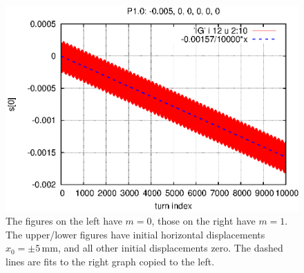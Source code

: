 \documentclass[]{article}
\begin{document}
\begin{figure}[h]
\includegraphics[scale=0.6]{eps/SpinEvolve12.P1.0.eps}
\caption{\label{fig:SpinEvolve11.12}The figures on the left have 
$m=0$, those on the right have $m=1$. The upper/lower figures
have initial horizontal displacements $x_0=\pm5\,$mm, and all other
initial displacements zero. The dashed lines are fits to 
the right graph copied to the left. 
}
\end{figure}
%
\end{document}
